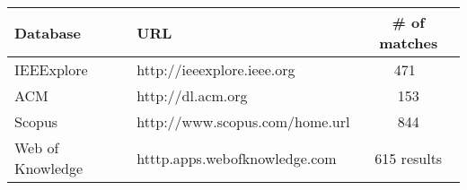 \begin{center}
\label{databasetable}
\begin{tabular}{l l c }
    \bfseries{Database} & \bfseries{URL} & \bfseries{\# of matches} \\
    \hline
    IEEExplore & http://ieeexplore.ieee.org & 471 \\
    ACM & http://dl.acm.org & 153 \\
    Scopus & http://www.scopus.com/home.url & 844 \\
    Web of Knowledge & htttp.apps.webofknowledge.com &  615 results \\
    \hline
\end{tabular}
\end{center}
